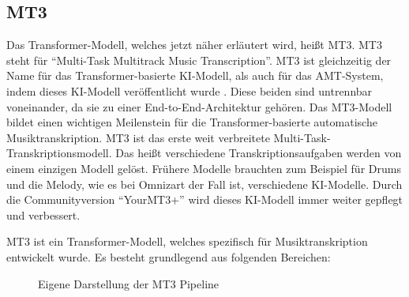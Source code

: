\subsection{MT3}
Das Transformer-Modell, welches jetzt näher erläutert wird, heißt MT3.
MT3 steht für \enquote{Multi-Task Multitrack Music Transcription}.
MT3 ist gleichzeitig der Name für das Transformer-basierte KI-Modell, als auch für das AMT-System, indem dieses KI-Modell veröffentlicht wurde \cite{gardner2021mt3}.
Diese beiden sind untrennbar voneinander, da sie zu einer End-to-End-Architektur gehören.
Das MT3-Modell bildet einen wichtigen Meilenstein für die Transformer-basierte automatische Musiktranskription.
MT3 ist das erste weit verbreitete Multi-Task-Transkriptionsmodell.
Das heißt verschiedene Transkriptionsaufgaben werden von einem einzigen Modell gelöst.
Frühere Modelle brauchten zum Beispiel für Drums und die Melody,
wie es bei Omnizart der Fall ist, verschiedene KI-Modelle.
Durch die Communityversion \enquote{YourMT3+} wird dieses KI-Modell immer weiter gepflegt und verbessert.

MT3 ist ein Transformer-Modell, welches spezifisch für Musiktranskription entwickelt wurde.
Es besteht grundlegend aus folgenden Bereichen:
\begin{figure}[H]
    \vspace{1em}
    \vspace{1em}

    \label{fig:mt3}
    \caption[MT3 Pipeline]{Eigene Darstellung der MT3 Pipeline}
\end{figure}

